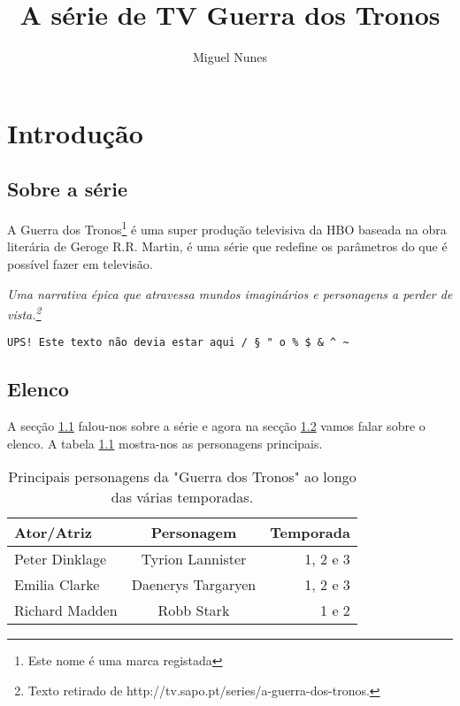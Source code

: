\documentclass[a4paper,10pt]{report}
\title{A série de TV Guerra dos Tronos}
\author{Miguel Nunes}
\date{}
\begin{document}
\maketitle
\chapter{Introdução}
\section{Sobre a série}
\label{sas}
A {\huge Guerra dos Tronos}\footnote{Este nome é uma marca registada} é uma super produção televisiva da HBO baseada na obra literária de Geroge R.R. Martin, é uma série {\scriptsize que redefine os parâmetros do que é possível fazer em televisão}.
\vskip 1cm
\begin{center}
\textit{Uma narrativa épica que {\Large atravessa mundos imaginários} e personagens a perder de vista.\footnote{Texto retirado de http://tv.sapo.pt/series/a-guerra-dos-tronos.}}
\end{center}
\vskip 1cm
\begin{verbatim}
UPS! Este texto não devia estar aqui / § " o % $ & ^ ~
\end{verbatim}
\section{Elenco}
\label{e}
A secção \ref{sas} falou-nos sobre a série e agora na secção \ref{e} vamos falar sobre o elenco. A tabela \ref{te} mostra-nos as personagens principais.
\begin{table}[h]
\centering
\begin{tabular}{|l|c|r|}
\hline
\textbf{Ator/Atriz} & \textbf{Personagem} & \textbf{Temporada} \\ \hline
Peter Dinklage & Tyrion Lannister & 1, 2 e 3 \\ \hline
Emilia Clarke & Daenerys Targaryen & 1, 2 e 3 \\ \hline
Richard Madden & Robb Stark & 1 e 2 \\ \hline
\end{tabular}
\caption{Principais personagens da "Guerra dos Tronos" ao longo das várias temporadas.}
\label{te}
\end{table}
\end{document}
